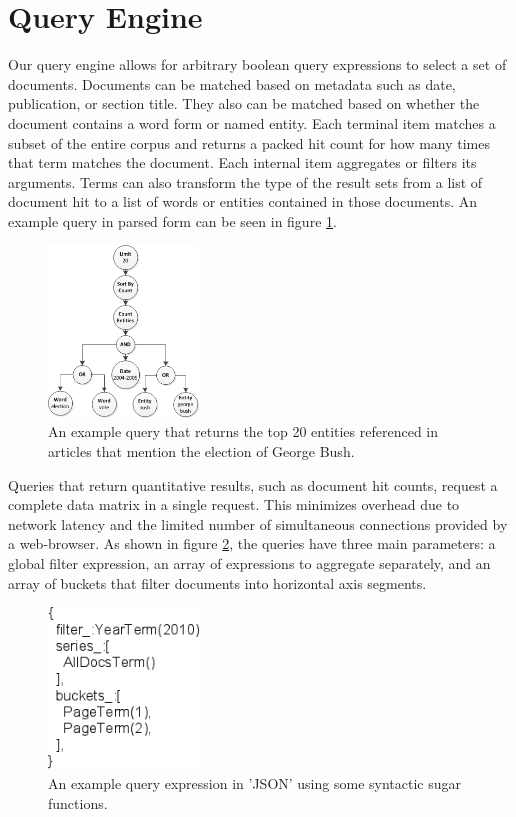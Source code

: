 \section{Query Engine}
Our query engine allows for arbitrary boolean query expressions to select a set of documents.  Documents can be matched based on metadata such as date, publication, or section title. They also can be matched based on whether the document contains a word form or named entity.  Each terminal item matches a subset of the entire corpus and returns a packed hit count for how many times that term matches the document.  Each internal item aggregates or filters its arguments.  Terms can also transform the type of the result sets from a list of document hit to a list of words or entities contained in those documents.  An example query in parsed form can be seen in figure \ref{fig:entity-query}.

\begin{figure}[htb]
  \centerline{
    \includegraphics[width=40mm]{figures/entity-query.png}
  }
  \caption{An example query that returns the top 20 entities referenced in articles that mention the election of George Bush.}
  \label{fig:entity-query}
\end{figure}

Queries that return quantitative results, such as document hit counts, request a complete data matrix in a single request.  This minimizes overhead due to network latency and the limited number of simultaneous connections provided by a web-browser.  As shown in figure \ref{fig:json-query}, the queries have three main parameters: a global filter expression, an array of expressions to aggregate separately, and an array of buckets that filter documents into horizontal axis segments.

\begin{figure}[htb]
  \centerline{
    \includegraphics[width=40mm]{figures/json-query.png}
  }
  \caption{An example query expression in 'JSON' using some syntactic sugar functions.}
  \label{fig:json-query}
\end{figure}

